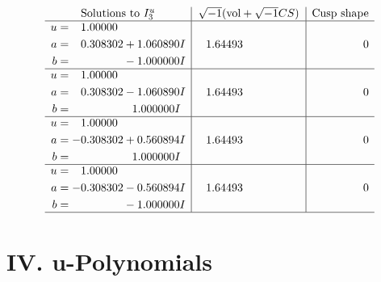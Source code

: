 \documentclass[1p]{elsarticle_modified}
\theoremstyle{definition}
\newcommand{\I}{\sqrt{-1}}
\begin{document}
$$\begin{array}{c|c|c}  
\text{Solutions to }I^u_{3}& \I (\text{vol} + \sqrt{-1}CS) & \text{Cusp shape}\\
 \hline 
\begin{aligned}
u &= \phantom{-}1.00000\phantom{ +0.000000I} \\
a &= \phantom{-}0.308302 + 1.060890 I \\
b &= \phantom{-0.000000 } -1.000000 I\end{aligned}
 & \phantom{-}1.64493\phantom{ +0.000000I} & \phantom{-0.000000 } 0 \\ \hline\begin{aligned}
u &= \phantom{-}1.00000\phantom{ +0.000000I} \\
a &= \phantom{-}0.308302 - 1.060890 I \\
b &= \phantom{-0.000000 -}1.000000 I\end{aligned}
 & \phantom{-}1.64493\phantom{ +0.000000I} & \phantom{-0.000000 } 0 \\ \hline\begin{aligned}
u &= \phantom{-}1.00000\phantom{ +0.000000I} \\
a &= -0.308302 + 0.560894 I \\
b &= \phantom{-0.000000 -}1.000000 I\end{aligned}
 & \phantom{-}1.64493\phantom{ +0.000000I} & \phantom{-0.000000 } 0 \\ \hline\begin{aligned}
u &= \phantom{-}1.00000\phantom{ +0.000000I} \\
a &= -0.308302 - 0.560894 I \\
b &= \phantom{-0.000000 } -1.000000 I\end{aligned}
 & \phantom{-}1.64493\phantom{ +0.000000I} & \phantom{-0.000000 } 0\\
 \hline 
 \end{array}$$\newpage
\newpage\renewcommand{\arraystretch}{1}
\centering \section*{ IV. u-Polynomials}
\end{document}
